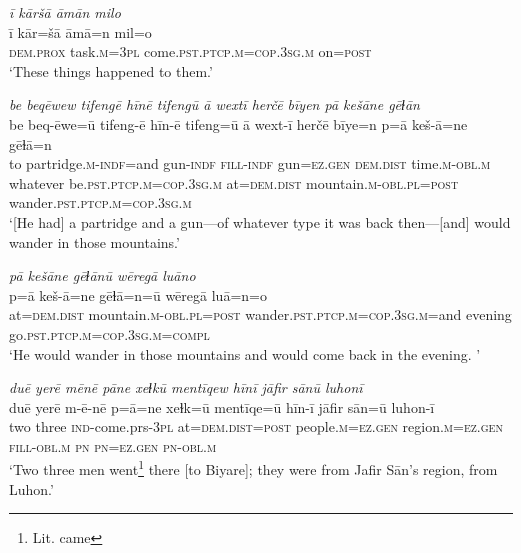 \ea \label{BP.210}
\textit{ī kāršā āmān milo} \\ 
\gll ī kār=šā āmā=n mil=o \\ 
 \textsc{dem.prox} task\textsc{.m}\textsc{=3pl} come\textsc{.pst}\textsc{.ptcp}\textsc{.m}\textsc{=cop}\textsc{.3sg}\textsc{.m} on\textsc{=\textsc{post}} \\ 
\glt `These things happened to them.'
\z 
 
\ea \label{ŠJ.7}
\textit{be beqēwew tifengē hīnē tifengū ā wextī herčē bīyen pā kešāne gēɫān} \\ 
\gll be beq-ēwe=ū tifeng-ē hīn-ē tifeng=ū ā wext-ī herčē bīye=n p=ā keš-ā=ne gēɫā=n \\ 
 to partridge\textsc{.m}\textsc{-indf}=and gun\textsc{-indf} \textsc{fill}\textsc{-indf} gun\textsc{=ez.gen} \textsc{dem.dist} time\textsc{.m}\textsc{-obl}\textsc{.m} whatever be\textsc{.pst}\textsc{.ptcp}\textsc{.m}\textsc{=cop}\textsc{.3sg}\textsc{.m} at=\textsc{dem.dist} mountain\textsc{.m}\textsc{-obl}\textsc{.pl}\textsc{=\textsc{post}} wander\textsc{.pst}\textsc{.ptcp}\textsc{.m}\textsc{=cop}\textsc{.3sg}\textsc{.m} \\ 
\glt `[He had] a partridge and a gun—of whatever type it was back then—[and] would wander in those mountains.'
\z 
 
\ea \label{ŠJ.8}
\textit{pā kešāne gēɫānū wēregā luāno} \\ 
\gll p=ā keš-ā=ne gēɫā=n=ū wēregā luā=n=o \\ 
 at=\textsc{dem.dist} mountain\textsc{.m}\textsc{-obl}\textsc{.pl}\textsc{=\textsc{post}} wander\textsc{.pst}\textsc{.ptcp}\textsc{.m}\textsc{=cop}\textsc{.3sg}\textsc{.m}=and evening go\textsc{.pst}\textsc{.ptcp}\textsc{.m}\textsc{=cop}\textsc{.3sg}\textsc{.m}\textsc{=compl} \\ 
\glt `He would wander in those mountains and would come back in the evening. '
\z 
 
\ea \label{ŠJ.9}
\textit{duē yerē mēnē pāne xeɫkū mentīqew hīnī jāfir sānū luhonī} \\ 
\gll duē yerē m-ē-nē p=ā=ne xeɫk=ū mentīqe=ū hīn-ī jāfir sān=ū luhon-ī \\ 
 two three \textsc{ind-}come.prs\textsc{-3pl} at=\textsc{dem.dist}\textsc{=\textsc{post}} people\textsc{.m}\textsc{=ez.gen} region\textsc{.m}\textsc{=ez.gen} \textsc{fill}\textsc{-obl}\textsc{.m} \textsc{pn} \textsc{pn}\textsc{=ez.gen} \textsc{pn}\textsc{-obl}\textsc{.m} \\ 
\glt `Two three men went\footnote{Lit. came} there [to Biyare]; they were from Jafir Sān’s region, from Luhon.'
\z 
 
